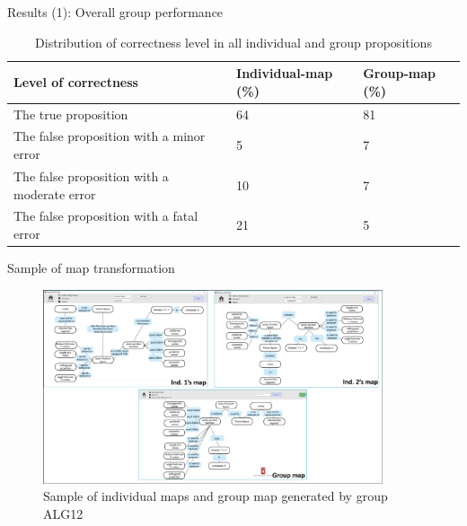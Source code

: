 \begin{frame}[allowframebreaks]{Results (1): Overall group performance}
\begin{table}[tb]
    \caption{Distribution of correctness level in all individual and group propositions}
    \label{dist_correct}
    \begin{center}
        \begin{tabular}{ p{6cm}|p{1.5cm}|p{1.5cm}  }
            \hline
            Level of correctness & Individual-map (\%) & Group-map (\%)\\
            \hline
            The true proposition & 64 & 81 \\
            The false proposition with a minor error & 5 & 7 \\
            The false proposition with a moderate error & 10 & 7 \\
            The false proposition with a fatal error & 21 & 5 \\
            \hline
        \end{tabular}
    \end{center}
\end{table}



\end{frame}

\begin{frame}{Sample of map transformation}
    \begin{figure}[tb]
    \begin{center}
        \includegraphics[width=100mm]{images/a1_dist_correctness.pdf}
    \end{center}
    \caption{Sample of individual maps and group map generated by group ALG12}
    \label{a1::map_sample}
\end{figure}
\end{frame}


